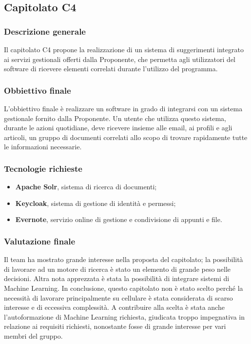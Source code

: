 \subsection{Capitolato C4}

\subsubsection{Descrizione generale}
Il capitolato C4 propone la realizzazione di un sistema di suggerimenti integrato ai servizi gestionali offerti dalla Proponente, che permetta agli utilizzatori del software di ricevere elementi correlati durante l'utilizzo del programma.

\subsubsection{Obbiettivo finale}
L'obbiettivo finale è realizzare un software in grado di integrarsi con un sistema gestionale fornito dalla Proponente.
Un utente che utilizza questo sistema, durante le azioni quotidiane, deve ricevere insieme alle email, ai profili e agli articoli, un gruppo di documenti correlati allo scopo di trovare rapidamente tutte le informazioni necessarie.

\subsubsection{Tecnologie richieste}
\begin{itemize}
\item \textbf{Apache Solr}, sistema di ricerca di documenti;
\item \textbf{Keycloak}, sistema di gestione di identità e permessi;
\item \textbf{Evernote}, servizio online di gestione e condivisione di appunti e file.
\end{itemize}

\subsubsection{Valutazione finale}
Il team ha mostrato grande interesse nella proposta del capitolato; la possibilità di lavorare ad un motore di ricerca è stato un elemento di grande peso nelle decisioni. 
Altra nota apprezzata è stata la possibilità di integrare sistemi di Machine Learning.
In conclusione, questo capitolato non è stato scelto perché la necessità di lavorare principalmente su cellulare è stata considerata di scarso interesse e di eccessiva complessità. 
A contribuire alla scelta è stata anche l'autoformazione di Machine Learning richiesta, giudicata troppo impegnativa in relazione ai requisiti richiesti, nonostante fosse di grande interesse per vari membri del gruppo.
